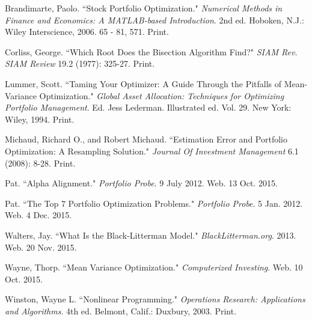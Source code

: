 \documentclass[12pt,titlepage,letter]{article}
\begin{document}
\begin{thebibliography}{10}
	 Brandimarte, Paolo. ``Stock Portfolio Optimization."  \emph{Numerical Methods in Finance and Economics: A MATLAB-based Introduction}. 2nd ed. Hoboken, N.J.: Wiley Interscience, 2006. 65 - 81, 571. Print.

	 Corliss, George. ``Which Root Does the Bisection Algorithm Find?" \emph{SIAM Rev. SIAM Review} 19.2 (1977): 325-27. Print.
	
	 Lummer, Scott. ``Taming Your Optimizer: A Guide Through the Pitfalls of Mean-Variance Optimization." \emph{Global Asset Allocation: Techniques for Optimizing Portfolio Management}. Ed. Jess Lederman. Illustrated ed. Vol. 29. New York: Wiley, 1994. Print.
	
	 Michaud, Richard O., and Robert Michaud. ``Estimation Error and Portfolio Optimization: A Resampling Solution." \emph{Journal Of Investment Management} 6.1 (2008): 8-28. Print.
	
	 Pat. ``Alpha Alignment." \emph{Portfolio Probe}. 9 July 2012. Web. 13 Oct. 2015.
	
	 Pat. ``The Top 7 Portfolio Optimization Problems."  \emph{Portfolio Probe}. 5 Jan. 2012. Web. 4 Dec. 2015.

	 Walters, Jay. ``What Is the Black-Litterman Model." \emph{BlackLitterman.org}. 2013. Web. 20 Nov. 2015.

	 Wayne, Thorp. ``Mean Variance Optimization."  \emph{Computerized Investing}. Web. 10 Oct. 2015.
	
	 Winston, Wayne L. ``Nonlinear Programming."  \emph{Operations Research: Applications and Algorithms}. 4th ed. Belmont, Calif.: Duxbury, 2003. Print.
\end{thebibliography}
\end{document}
